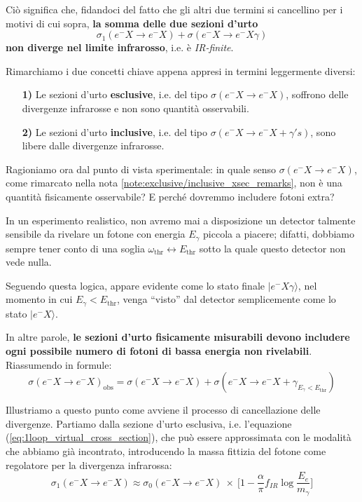\documentclass[../main.tex]{subfiles}
\begin{document}
Ciò significa che, fidandoci del fatto che gli altri due termini si cancellino per i motivi di cui sopra, \textbf{la somma delle due sezioni d'urto}
\[
\boxed{\sigma_1(e^-X\rightarrow e^-X) + \sigma(e^-X\rightarrow e^-X\gamma)}
\]
\textbf{non diverge nel limite infrarosso}, i.e. è \textit{IR-finite}.

\begin{nota}
    Rimarchiamo i due concetti chiave appena appresi in termini leggermente diversi:
    \begin{enumerate}
        \item[\textbf{1)}] Le sezioni d'urto \textbf{esclusive}, i.e. del tipo \(\sigma(e^-X\rightarrow e^-X)\), soffrono delle divergenze infrarosse e non sono quantità osservabili.
        \item[\textbf{2)}] Le sezioni d'urto \textbf{inclusive}, i.e. del tipo \(\sigma(e^-X\rightarrow e^-X +\gamma 's)\), sono libere dalle divergenze infrarosse.
    \end{enumerate}
    \label{note:exclusive/inclusive_xsec_remarks}
\end{nota}

Ragioniamo ora dal punto di vista sperimentale:
in quale senso \(\sigma(e^-X\rightarrow e^-X)\), come rimarcato nella nota \ref{note:exclusive/inclusive_xsec_remarks}, non è una quantità fisicamente osservabile? E perché dovremmo includere fotoni extra?

In un esperimento realistico, non avremo mai a disposizione un detector talmente sensibile da rivelare un fotone con energia \(E_\gamma\) piccola a piacere; difatti, dobbiamo sempre tener conto di una soglia \(\omega_\text{thr} \leftrightarrow E_\text{thr}\) sotto la quale questo detector non vede nulla.

Seguendo questa logica, appare evidente come lo stato finale \(|e^-X\gamma\rangle\), nel momento in cui \(E_\gamma < E_\text{thr}\), venga “visto” dal detector semplicemente come lo stato \(|e^-X\rangle\).

In altre parole, \textbf{le sezioni d'urto fisicamente misurabili devono includere ogni possibile numero di fotoni di bassa energia non rivelabili}. Riassumendo in formule:
\[
\boxed{\sigma(e^-X\rightarrow e^-X)_\text{obs} = \sigma(e^-X\rightarrow e^-X) + \sigma(e^-X\rightarrow e^-X+\gamma_{E_\gamma < E_\text{thr}})}
\]

Illustriamo a questo punto come avviene il processo di cancellazione delle divergenze. 
Partiamo dalla sezione d'urto esclusiva, i.e. l'equazione (\ref{eq:1loop_virtual_cross_section}), che può essere approssimata con le modalità che abbiamo già incontrato, introducendo la massa fittizia del fotone come regolatore per la divergenza infrarossa:
\[
\sigma_1(e^-X\rightarrow e^-X) \approx \sigma_0(e^-X\rightarrow e^-X)~\times~\bigg[ 1-\frac{\alpha}{\pi} f_{IR}\log\frac{E_e}{m_\gamma}\bigg]
\]
\end{document}
